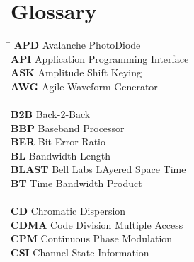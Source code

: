 
\chapter*{Glossary}

\scriptsize
\begin{multicols}{2}
%
\begin{tabbing}
\hspace*{40pt}	\= \kill
\textbf{APD}		\>	Avalanche PhotoDiode								\\
\textbf{API}		\>	Application Programming Interface						\\
\textbf{ASK}		\>	Amplitude Shift Keying								\\
\textbf{AWG}		\>	Agile Waveform Generator							\\
\\
\textbf{B2B}		\>	Back-2-Back									\\
\textbf{BBP}		\>	Baseband Processor								\\
\textbf{BER}		\>	Bit Error Ratio									\\
\textbf{BL}		\>	Bandwidth-Length								\\
\textbf{BLAST}		\>	\underline{B}ell Labs \underline{LA}yered \underline{S}pace \underline{T}ime	\\
\textbf{BT}		\>	Time Bandwidth Product								\\
\\
\textbf{CD}		\>	Chromatic Dispersion								\\
\textbf{CDMA}		\>	Code Division Multiple Access							\\
\textbf{CPM}		\>	Continuous Phase Modulation							\\
\textbf{CSI}		\>	Channel State Information							\\


\end{tabbing}
\end{multicols}
